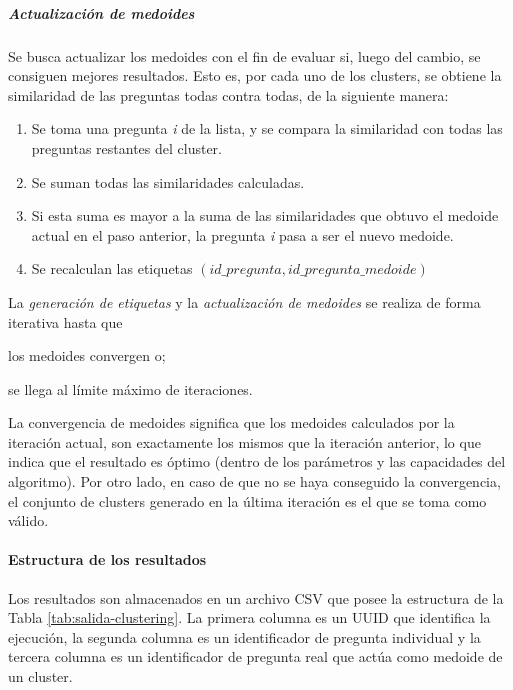 \subparagraph{Actualización de medoides}
Se busca actualizar los medoides con el fin de evaluar si, luego del cambio, se consiguen mejores resultados. Esto es, por cada uno de los clusters, se obtiene la similaridad de las preguntas todas contra todas, de la siguiente manera:

\begin{enumerate}
	\item Se toma una pregunta \textit{i} de la lista, y se compara la similaridad con todas las preguntas restantes del cluster.
	\item Se suman todas las similaridades calculadas.
	\item Si esta suma es mayor a la suma de las similaridades que obtuvo el medoide actual en el paso anterior, la pregunta \textit{i} pasa a ser el nuevo medoide.
	\item Se recalculan las etiquetas \((id\_pregunta, id\_pregunta\_medoide)\)
\end{enumerate}

La \textit{generación de etiquetas} y la \textit{actualización de medoides} se realiza de forma iterativa hasta que \begin{enumerate*} [label=(\roman*)] \item los medoides convergen o; \item se llega al límite máximo de iteraciones.\end{enumerate*} La convergencia de medoides significa que los medoides calculados por la iteración actual, son exactamente los mismos que la iteración anterior, lo que indica que el resultado es óptimo (dentro de los parámetros y las capacidades del algoritmo). Por otro lado, en caso de que no se haya conseguido la convergencia, el conjunto de clusters generado en la última iteración es el que se toma como válido.

\paragraph{Estructura de los resultados}
Los resultados son almacenados en un archivo CSV que posee la estructura de la Tabla \ref{tab:salida-clustering}. La primera columna es un UUID que identifica la ejecución, la segunda columna es un identificador de pregunta individual y la tercera columna es un identificador de pregunta real que actúa como medoide de un cluster.

